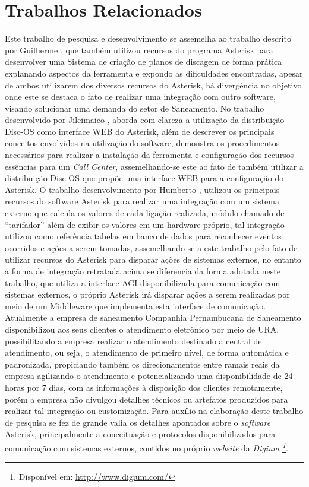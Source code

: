 \section*{Trabalhos Relacionados}
Este trabalho de pesquisa e desenvolvimento se assemelha ao trabalho descrito por Guilherme \cite{VIEIRA:2007}, que também utilizou recursos do programa Asterisk para desenvolver uma Sistema de criação de planos de discagem de forma prática explanando aspectos da ferramenta e expondo as dificuldades encontradas, apesar de ambos utilizarem dos diversos recursos do Asterisk, há divergência no objetivo onde este se destaca o fato de realizar uma integração com outro software, visando solucionar uma demanda do setor de Saneamento.  No trabalho desenvolvido por Jilcimaico \cite{DARU:2008}, aborda com clareza a utilização da distribuição Disc-OS como interface WEB do Asterisk, além de descrever os principais conceitos envolvidos na utilização do software, demonstra os procedimentos necessários para realizar a instalação da ferramenta e configuração dos recursos essências para um \textit{Call Center}, assemelhando-se este ao fato de também utilizar a distribuição Disc-OS que propõe uma interface WEB para a configuração do Asterisk.
O trabalho desenvolvimento por Humberto \cite{CAMPOS:2007}, utilizou os principais recursos do software Asterisk para realizar uma integração com um sistema externo que calcula os valores de cada ligação realizada, módulo chamado de “tarifador” além de exibir os valores em um hardware próprio, tal integração utilizou como referência tabelas em banco de dados para reconhecer eventos ocorridos e ações a serem tomadas, assemelhando-se a este trabalho pelo fato de utilizar recursos do Asterisk para disparar ações de sistemas externos, no entanto a forma de integração retratada acima se diferencia da forma adotada neste trabalho, que utiliza a interface AGI disponibilizada para comunicação com sistemas externos, o próprio Asterisk irá disparar ações a serem realizadas por meio de um Middleware que implementa esta interface de comunicação.
Atualmente a empresa de saneamento Companhia Pernambucana de Saneamento \cite{COMPESA:URA} disponibilizou aos seus clientes o atendimento eletrônico por meio de URA, possibilitando a empresa realizar o atendimento destinado a central de atendimento, ou seja, o atendimento de primeiro nível, de forma automática e padronizada, propiciando também os direcionamentos entre ramais reais da empresa agilizando o atendimento e potencializando uma disponibilidade de 24 horas por 7 dias, com as informações à disposição dos clientes remotamente, porém a empresa não divulgou detalhes técnicos ou artefatos produzidos para realizar tal integração ou customização.
Para auxílio na elaboração deste trabalho de pesquisa se fez de grande valia os detalhes apontados sobre o \textit{software} Asterisk, principalmente a conceituação e protocolos disponibilizados para comunicação com sistemas externos, contidos no próprio \textit{website} da \textit{Digium \footnote{Disponível em: \url{http://www.digium.com/}}}. 
